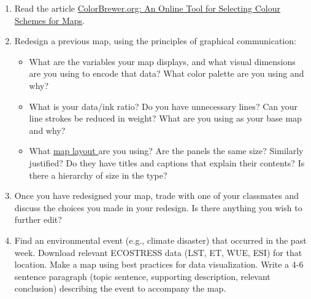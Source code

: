 \documentclass[oneside,a4paper,11pt,explicit]{book}
\begin{document}
\begin{tcolorbox}[colback=yellow!5!white,colframe=MACred,title= \vspace{.2em} \Large Make a Map Assignments]
	\large
	\begin{enumerate}
		\item Read the article \href{https://jeremydforsythe.github.io/icecream-tutorials/Tutorial12_MakingBetterMaps/ColorBrewer.pdf}{ColorBrewer.org: An Online Tool for Selecting Colour
Schemes for Maps}.
            \item Redesign a previous map, using the principles of graphical communication:
	    \begin{itemize}
		      \item What are the variables your map displays, and what visual dimensions are you using to encode that data? What color palette are you using and why?
		      \item What is your data/ink ratio? Do you have unnecessary lines? Can your line strokes be reduced in weight? What are you using as your base map and why?
		      \item What \href{https://en.wikipedia.org/wiki/Map_layout}{map layout }are you using? Are the panels the same size? Similarly justified? Do they have titles and captions that explain their contents? Is there a hierarchy of size in the type?
            \end{itemize}
    \item Once you have redesigned your map, trade with one of your classmates and discuss the choices you made in your redesign. Is there anything you wish to further edit? 
    \item Find an environmental event (e.g., climate disaster) that occurred in the past week. Download relevant ECOSTRESS data (LST, ET, WUE, ESI) for that location. Make a map using best practices for data visualization. Write a 4-6 sentence paragraph (topic sentence, supporting description, relevant conclusion) describing the event to accompany the map.
	\end{enumerate}
\end{tcolorbox}
\end{document}
